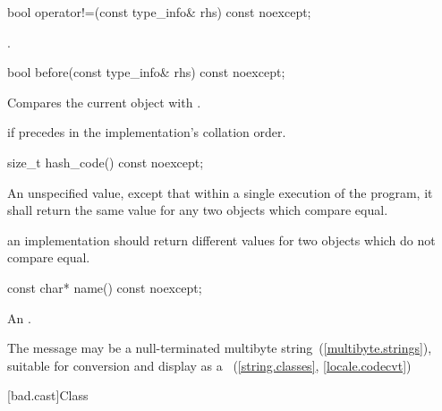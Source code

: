 %
\begin{itemdecl}
bool operator!=(const type_info& rhs) const noexcept;
\end{itemdecl}

\begin{itemdescr}
\pnum
\returns
{}.
\end{itemdescr}

%
\begin{itemdecl}
bool before(const type_info& rhs) const noexcept;
\end{itemdecl}

\begin{itemdescr}
\pnum
\effects
Compares the current object with .

\pnum
\returns
{}
if
precedes  in the implementation's collation order.
\end{itemdescr}

%
\begin{itemdecl}
size_t hash_code() const noexcept;
\end{itemdecl}

\begin{itemdescr}
\pnum
\returns An unspecified value, except that within a single execution of the
program, it shall return the same value for any two 
objects which compare equal.

\pnum
\remark an implementation should return different values for two
 objects which do not compare equal.
\end{itemdescr}


%
\begin{itemdecl}
const char* name() const noexcept;
\end{itemdecl}

\begin{itemdescr}
\pnum
\returns
An  \ntbs.

\pnum
\notes
The message may be a null-terminated multibyte string~(\ref{multibyte.strings}),
suitable for conversion and display as a
~(\ref{string.classes}, \ref{locale.codecvt})
\end{itemdescr}

[bad.cast]{Class }

